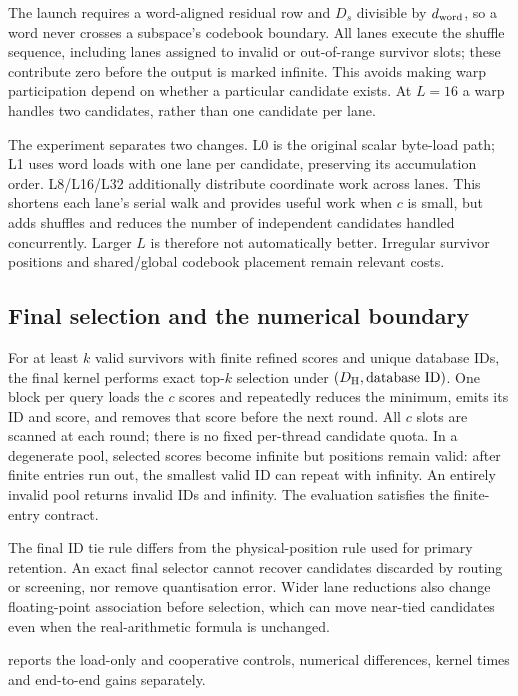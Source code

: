 The launch requires a word-aligned residual row and $D_s$ divisible by
$d_{\rm word}$, so a word never crosses a subspace's codebook boundary. All lanes
execute the shuffle sequence, including lanes assigned to invalid or
out-of-range survivor slots; these contribute zero before the output
is marked infinite. This avoids making warp participation depend on
whether a particular candidate exists. At $L=16$ a warp handles two
candidates, rather than one candidate per lane.

The experiment separates two changes. L0 is the original scalar
byte-load path; L1 uses word loads with one lane per candidate, preserving
its accumulation order. L8/L16/L32 additionally distribute coordinate
work across lanes. This shortens each lane's serial walk and provides
useful work when $c$ is small, but adds shuffles and reduces the number
of independent candidates handled concurrently. Larger $L$ is therefore
not automatically better. Irregular survivor positions and shared/global
codebook placement remain relevant costs.

\subsection{Final selection and the numerical boundary}

For at least $k$ valid survivors with finite refined scores and unique
database IDs, the final kernel performs exact top-$k$ selection under
$(D_{\mathrm{H}},\mathrm{database\ ID})$. One block per query loads the
$c$ scores and repeatedly reduces the minimum, emits its ID and score,
and removes that score before the next round. All $c$ slots are scanned
at each round; there is no fixed per-thread candidate quota. In a
degenerate pool, selected scores become infinite but positions remain
valid: after finite entries run out, the smallest valid ID can repeat
with infinity. An entirely invalid pool returns invalid IDs and infinity.
The evaluation satisfies the finite-entry contract.

The final ID tie rule differs from the physical-position rule used for
primary retention. An exact final selector cannot recover candidates
discarded by routing or screening, nor remove quantisation error. Wider
lane reductions also change floating-point association before selection,
which can move near-tied candidates even when the real-arithmetic
formula is unchanged.

 reports the load-only and cooperative controls,
numerical differences, kernel times and end-to-end gains separately.
